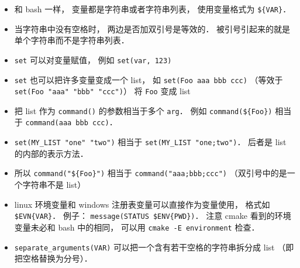 \begin{itemize}
\item 和 bash 一样， 变量都是字符串或者字符串列表， 使用变量格式为 \verb`${VAR}`．
\item 当字符串中没有空格时， 两边是否加双引号是等效的． 被引号引起来的就是单个字符串而不是字符串列表．
\item \verb`set` 可以对变量赋值， 例如 \verb`set(var, 123)`
\item \verb`set` 也可以把许多变量变成一个 list， 如 \verb`set(Foo aaa bbb ccc)` （等效于 \verb|set(Foo "aaa" "bbb" "ccc")|） 将 \verb`Foo` 变成 list
\item 把 list 作为 \verb|command()| 的参数相当于多个 \verb|arg|． 例如 \verb`command(${Foo})` 相当于 \verb`command(aaa bbb ccc)`．
\item \verb|set(MY_LIST "one" "two")| 相当于 \verb|set(MY_LIST "one;two")|． 后者是 list 的内部的表示方法．
\item 所以 \verb`command("${Foo}")` 相当于 \verb`command("aaa;bbb;ccc")` （双引号中的是一个字符串不是 list）
\item linux 环境变量和 windows 注册表变量可以直接作为变量使用， 格式如 \verb`$EVN{VAR}`． 例子： \verb|message(STATUS $ENV{PWD})|． 注意 cmake 看到的环境变量未必和 bash 中的相同， 可以用 \verb`cmake -E environment` 检查．
\item \verb|separate_arguments(VAR)| 可以把一个含有若干空格的字符串拆分成 list （即把空格替换为分号）．
\end{itemize}

